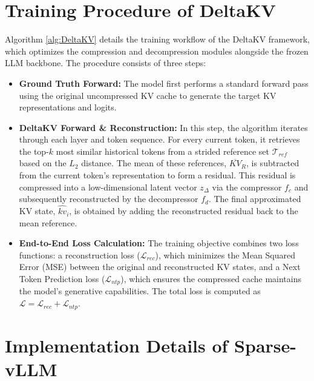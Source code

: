 \section{Training Procedure of DeltaKV}
\label{app:training}

Algorithm \ref{alg:DeltaKV} details the training workflow of the DeltaKV framework, which optimizes the compression and decompression modules alongside the frozen LLM backbone. The procedure consists of three steps:

\begin{itemize}[nolistsep, left=0pt]
  \item \textbf{Ground Truth Forward:} 
  The model first performs a standard forward pass using the original uncompressed KV cache to generate the target KV representations and logits.
  
  \item \textbf{DeltaKV Forward \& Reconstruction:} 
  In this step, the algorithm iterates through each layer and token sequence. For every current token, it retrieves the top-$k$ most similar historical tokens from a strided reference set $\mathcal{T}_{ref}$ based on the $L_2$ distance. The mean of these references, $\overline{KV}_R$, is subtracted from the current token's representation to form a residual. This residual is compressed into a low-dimensional latent vector $z_{\Delta}$ via the compressor $f_c$ and subsequently reconstructed by the decompressor $f_d$. The final approximated KV state, $\hat{kv}_i$, is obtained by adding the reconstructed residual back to the mean reference.
  
  \item \textbf{End-to-End Loss Calculation:} 
  The training objective combines two loss functions: a reconstruction loss ($\mathcal{L}_{rec}$), which minimizes the Mean Squared Error (MSE) between the original and reconstructed KV states, and a Next Token Prediction loss ($\mathcal{L}_{ntp}$), which ensures the compressed cache maintains the model's generative capabilities. The total loss is computed as $\mathcal{L} = \mathcal{L}_{rec} + \mathcal{L}_{ntp}$.
\end{itemize}





\section{Implementation Details of Sparse-vLLM}
\label{app:sparse_vllm}

